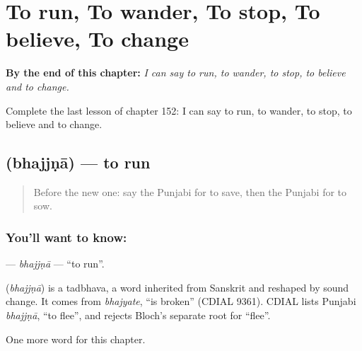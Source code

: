 
\chapter{To run, To wander, To stop, To believe, To change}
\label{ch:pa-to-run-to-wander-to-stop-to-believe-to-change}

\begin{chapteropening}
\textbf{By the end of this chapter:} \emph{I can say to run, to wander, to stop, to believe and to change.}

Complete the last lesson of chapter 152: I can say to run, to wander, to stop, to believe and to change.
\end{chapteropening}

\section[\texorpdfstring{\pa{ਭੱਜਣਾ} (bhajjṇā)}{ਭੱਜਣਾ (bhajjṇā)}]{ (bhajjṇā) — to run}

\label{lesson:PA-C152-bhajjna}



\begin{quote}
Before the new one: say the Punjabi for to save, then the Punjabi for to sow.
\end{quote}

\subsection*{You'll want to know: }
\textbf{} — \emph{bhajjṇā} — \textquotedblleft{}to run\textquotedblright{}.

\begin{cousinweb}
\textbf{} (\emph{bhajjṇā}) is a tadbhava, a word inherited from Sanskrit and reshaped by sound change. It comes from \emph{bhajyate}, \textquotedblleft{}is broken\textquotedblright{} (CDIAL 9361). CDIAL lists Punjabi \emph{bhajjṇā}, \textquotedblleft{}to flee\textquotedblright{}, and rejects Bloch's separate root for \textquotedblleft{}flee\textquotedblright{}.
\end{cousinweb}

\begin{grammarlens}[title={What you've built}]
One more word for this chapter.
\end{grammarlens}

